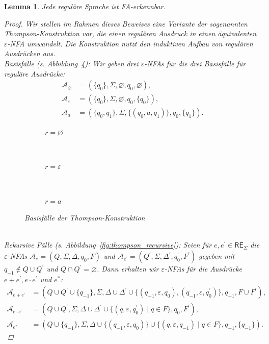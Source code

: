 \documentclass[11pt, a4paper]{article}
\theoremstyle{definition}
\theoremstyle{plain}
\newtheorem{lemma}[definition]{Lemma}
\numberwithin{equation}{section}
\let\emptyset\varnothing
\begin{document}
\begin{lemma}\label{lem:regex2nfa}
	Jede reguläre Sprache ist FA-erkennbar.
	\begin{proof}
		Wir stellen im Rahmen dieses Beweises eine Variante der sogenannten Thompson-Konstruktion vor, die einen regulären Ausdruck in einen äquivalenten $\varepsilon$-NFA umwandelt. Die Konstruktion nutzt den induktiven Aufbau von regulären Ausdrücken aus.\\
		Basisfälle (s. Abbildung~\ref{fig:thompson_basic}): 
		Wir geben drei $\varepsilon$-NFAs für die drei Basisfälle für reguläre Ausdrücke: 
		\begin{align*}
			\mathcal{A}_\emptyset &= (\{q_0\}, \Sigma, \emptyset, q_0, \emptyset),\\
			\mathcal{A}_\varepsilon &= (\{q_0\}, \Sigma, \emptyset, q_0, \{q_0\}),\\
			\mathcal{A}_a &= (\{q_0, q_1\}, \Sigma, \{(q_0, a, q_1)\}, q_0, \{q_1\}).
		\end{align*}
		\begin{figure}
			\centering
			\begin{subfigure}[b]{.25\textwidth}
				\centering
				
				\caption{$r = \emptyset$}
				\label{fig:thompson_empty}
			\end{subfigure}~
			\begin{subfigure}[b]{.25\textwidth}
				\centering
				
				\caption{$r = \varepsilon$}
				\label{fig:thompson_eps}
			\end{subfigure}~
			\begin{subfigure}[b]{.4\textwidth}
				\centering
				
				\caption{$r = a$}
				\label{fig:thompson_symbol}
			\end{subfigure}
			\caption{Basisfälle der Thompson-Konstruktion}
			\label{fig:thompson_basic}
		\end{figure}\\
		Rekursive Fälle (s. Abbildung~\ref{fig:thompson_recursive}):
		Seien für $e, e^\prime \in \mathsf{RE}_\Sigma$ die $\varepsilon$-NFAs $\mathcal{A}_e = (Q, \Sigma, \Delta, q_0, F)$ und $\mathcal{A}_{e^\prime} = (Q^\prime, \Sigma, \Delta^\prime, q_0^\prime, F^\prime)$ gegeben mit $q_{-1} \notin Q \cup Q^\prime$ und $Q \cap Q^\prime = \emptyset$. Dann erhalten wir $\varepsilon$-NFAs für die Ausdrücke $e+e^\prime, e \cdot e^\prime$ und $e^\ast$:
		\begin{align*}
			\mathcal{A}_{e+e^\prime} &= (Q \cup Q^\prime \cup \{q_{-1}\}, \Sigma, \Delta \cup \Delta^\prime \cup \{(q_{-1}, \varepsilon, q_0), (q_{-1}, \varepsilon, q_0^\prime)\}, q_{-1}, F \cup F^\prime),\\
			\mathcal{A}_{e \cdot e^\prime} &= (Q \cup Q^\prime, \Sigma, \Delta \cup \Delta^\prime \cup \{(q, \varepsilon, q_0^\prime) \mid q \in F \}, q_0, F^\prime),\\
			\mathcal{A}_{e^\ast} &= (Q \cup \{q_{-1}\}, \Sigma, \Delta \cup \{(q_{-1}, \varepsilon, q_0)\} \cup \{(q, \varepsilon, q_{-1}) \mid q \in F \}, q_{-1}, \{q_{-1}\}).
		\end{align*}
		

\end{proof}
\end{lemma}
\end{document}
